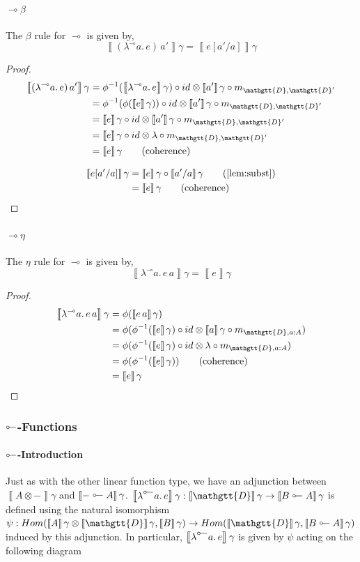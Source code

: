 \documentclass[acmsmall,nonacm]{acmart}
\renewcommand{\Delta}{\mathgtt{D}}
\newcommand{\sem}[1]{\left\llbracket{#1}\right\rrbracket}
\newcommand{\semg}[1]{\sem{#1}\gamma}
\newcommand{\lto}{\multimap}
\newcommand{\tol}{\mathrel{\rotatebox[origin=c]{180}{$\lto$}}}
\newcommand{\lamblto}[2]{\lambda^{{\lto}} #1.\, #2}
\newcommand{\lambtol}[2]{\lambda^{{\tol}} #1.\, #2}
\newcommand{\applto}[2]{#1 \, #2}
\begin{document}
\paragraph{$\lto\beta$}
The $\beta$ rule for $\lto$ is given by,
\[
  \semg{\applto {(\lamblto {a} {e})} {a'}} = \semg{e[a'/a]}
\]
\begin{proof}
\begin{align*}
  \semg{\applto {(\lamblto {a} {e})} {a'}}
  & = \phi^{-1}(\semg{\lamblto {a} {e}}) \circ id \otimes \semg{a'} \circ m_{\Delta,\Delta'} \\
  & = \phi^{-1}(\phi(\semg{e})) \circ id \otimes \semg{a'} \circ m_{\Delta,\Delta'} \\
  & = \semg{e} \circ id \otimes \semg{a'} \circ m_{\Delta,\Delta'} \\
  & = \semg{e} \circ id \otimes \lambda \circ m_{\Delta,\Delta'} \\
  & = \semg{e} \tag{coherence}
\end{align*}

\begin{align*}
  \semg{e[a'/a]}
  & = \semg{e} \circ \semg{a'/a} \tag{\cref{lem:subst}} \\
  & = \semg{e} \tag{coherence}
\end{align*}
\end{proof}

\paragraph{$\lto\eta$}
The $\eta$ rule for $\lto$ is given by,
\[
  \semg{\lamblto {a} {\applto e a}} = \semg{e}
\]
\begin{proof}
\begin{align*}
  \semg{\lamblto {a} {\applto e a}}
  & = \phi(\semg{\applto e a}) \\
  & = \phi(\phi^{-1}(\semg{e}) \circ id \otimes \semg{a} \circ m_{\Delta,a:A}) \\
  & = \phi(\phi^{-1}(\semg{e}) \circ id \otimes \lambda \circ m_{\Delta,a:A}) \\
  & = \phi(\phi^{-1}(\semg{e})) \tag{coherence} \\
  & = \semg{e}
\end{align*}
\end{proof}


\subsubsection{$\tol$-Functions}
\paragraph{$\tol$-Introduction}
Just as with the other linear function type, we have an adjunction between
$\semg{A \otimes -}$ and $\semg{- \tol A}$. $\semg{\lambtol a e} : \semg{\Delta} \to \semg{B \tol A}$ is defined using the
natural isomorphism
$\psi : Hom(\semg{A} \otimes \semg{\Delta}, \semg{B}) \to Hom(\semg{\Delta}, \semg{B \tol A})$
induced by this adjunction. In particular, $\semg{\lambtol a e}$ is given by $\psi$
acting on the following diagram
\end{document}
